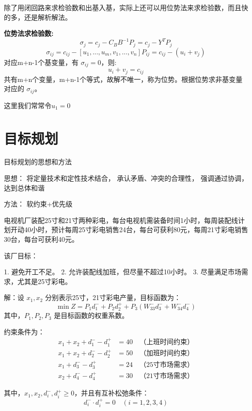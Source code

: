 \documentclass[12pt, a4paper, oneside, UTF8]{ctexbook}
\begin{document}
\begin{remark}
    除了用闭回路来求检验数和出基入基，实际上还可以用位势法来求检验数，而且快的多，还是解析解法。
\end{remark}

\textbf{位势法求检验数:}
\[
\sigma_j = c_j - C_B B^{-1} P_j = c_j - Y^T P_j
\]
\[
\sigma_{ij} = c_{ij} - [u_1, ..., u_m, v_1, ..., v_n] P_{ij} = c_{ij} - (u_i + v_j)
\]
对应m+n-1个基变量，有 \(\sigma_{ij} = 0\)，则:
\[ u_i + v_j = c_{ij} \]
共有m+n个变量，m+n-1个等式，故解不唯一，称为位势。根据位势求非基变量对应的 \(\sigma_{ij}\)。

这里我们常常令$u_1=0$

\section{目标规划}

\begin{definition}
    目标规划的思想和方法

思想：
将定量技术和定性技术结合，
承认矛盾、冲突的合理性，
强调通过协调，达到总体和谐

方法：
软约束+优先级
\end{definition}

\begin{example}
    电视机厂装配25寸和21寸两种彩电，每台电视机需装备时间1小时，每周装配线计划开动40小时，预计每周25寸彩电销售24台，每台可获利80元，每周21寸彩电销售30台，每台可获利40元。
    
    该厂目标：
    
    1. 避免开工不足。
    2. 允许装配线加班，但尽量不超过10小时。
    3. 尽量满足市场需求，尤其是25寸彩电。
    
    解：设 \(x_1, x_2\) 分别表示25寸，21寸彩电产量，目标函数为：
    \[
    \min Z = P_1 d_1^- + P_2 d_2^+ + P_3 (W_{33}^- d_3^- + W_{34}^- d_4^-)
    \]
    其中，\(P_1, P_2, P_3\) 是目标函数的权重系数。
    
    约束条件为：
    \[
    \begin{aligned}
    x_1 + x_2 + d_1^- - d_1^+ &= 40 \quad \text{（上班时间约束）} \\
    x_1 + x_2 + d_2^- - d_2^+ &= 50 \quad \text{（加班时间约束）} \\
    x_1 + d_3^- - d_3^+ &= 24 \quad \text{（25寸市场需求）} \\
    x_2 + d_4^- - d_4^+ &= 30 \quad \text{（21寸市场需求）}
    \end{aligned}
    \]
    
    其中，\(x_1, x_2, d_i^-, d_i^+ \geq 0\)，并且有互补松弛条件：
    \[
    d_i^- \cdot d_i^+ = 0 \quad (i = 1, 2, 3, 4)
    \]
\end{example}
\end{document}
